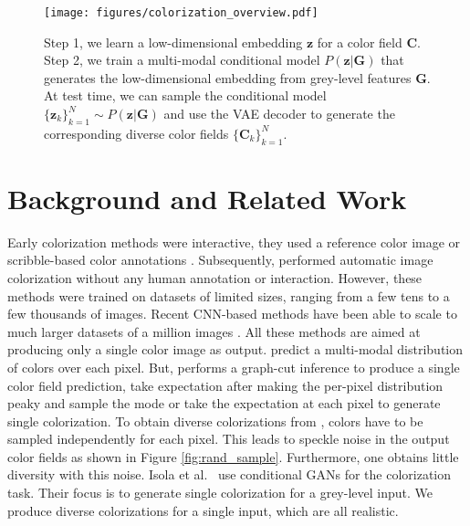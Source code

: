 \documentclass[10pt,twocolumn,letterpaper]{article}
\begin{document}
\begin{figure*}[t]
\centering
\texttt{[image: figures/colorization\_overview.pdf]}
\caption{Step 1, we learn a low-dimensional embedding $\mathbf{z}$ for a color field 
$\mathbf{C}$. Step 2, we train a multi-modal conditional model $P(\mathbf{z}|\mathbf{G})$ 
that generates the low-dimensional embedding from grey-level features $\mathbf{G}$. At test time,
we can sample the conditional model $\{ \mathbf{z}_{k} \}_{k=1}^{N} \sim P(\mathbf{z}|\mathbf{G})$ 
and use the VAE decoder to generate the corresponding diverse color fields $\{ \mathbf{C}_k \}_{k=1}^{N}$.} 
\label{fig:overview} 
\end{figure*}
\section{Background and Related Work} Early colorization methods were interactive,
they used a reference color image \cite{Welsh} or scribble-based
color annotations \cite{Levin}. Subsequently, \cite{Charpiat08ECCV,DeepCol,LSCol,Jancsary,Morimoto} performed
automatic image colorization without any human annotation or
interaction. However, these methods were trained on datasets
of limited sizes, ranging from a few tens to a few thousands 
of images. Recent CNN-based methods have been able to
scale to much larger datasets of a million images 
\cite{LetColor,Gustav16,ZhangColorful}. All these methods
are aimed at producing only a single color image as output.
\cite{Charpiat08ECCV,Gustav16,ZhangColorful} predict a multi-modal 
distribution of colors over each pixel. But, \cite{Charpiat08ECCV}
performs a graph-cut inference to produce a single color field
prediction, \cite{ZhangColorful} take expectation after making 
the per-pixel distribution peaky and \cite{Gustav16} sample the 
mode or take the expectation at each pixel to generate single 
colorization. To obtain diverse colorizations from 
\cite{Gustav16,ZhangColorful}, colors have to be sampled independently for 
each pixel. This leads to speckle noise in the output color fields 
as shown in Figure \ref{fig:rand_sample}. Furthermore, one obtains little
diversity with this noise. Isola et al.~\cite{Isola} use conditional
GANs for the colorization task. Their focus is to generate single
colorization for a grey-level input. We produce diverse 
colorizations for a single input, which are all realistic. \\ 
\centering
{} \hspace{5pt} 
\end{document}
